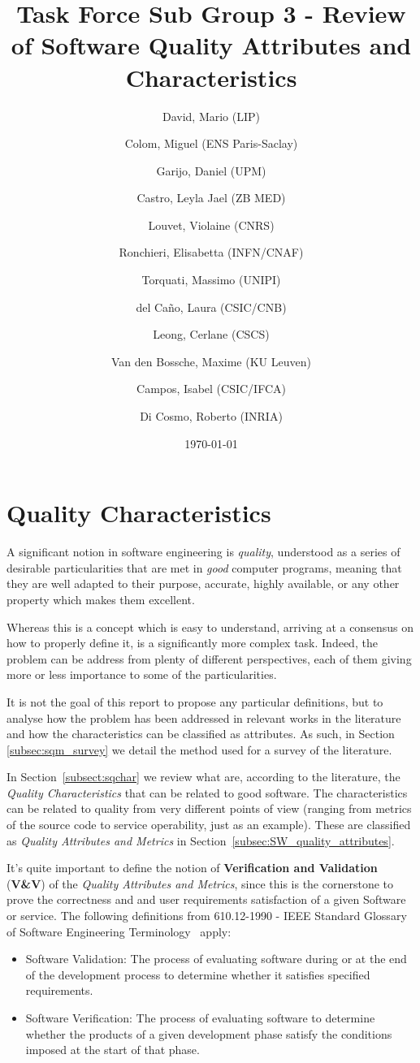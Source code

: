 \documentclass[a4paper]{article}
\title{Task Force Sub Group 3 - Review of Software Quality Attributes and Characteristics}
\author{
    David, Mario (LIP) \orcidlink{0000-0003-1802-5356} \and
    Colom, Miguel (ENS Paris-Saclay) \orcidlink{0000-0003-2636-0656} \and
    Garijo, Daniel (UPM) \orcidlink{0000-0003-0454-7145} \and
    Castro, Leyla Jael (ZB MED) \orcidlink{0000-0003-3986-0510} \and
    Louvet, Violaine (CNRS) \orcidlink{0000-0002-8742-8952} \and
    Ronchieri, Elisabetta (INFN/CNAF) \orcidlink{0000-0002-7341-6491} \and
    Torquati, Massimo (UNIPI) \orcidlink{0000-0001-6323-3459} \and
    del Ca\~{n}o, Laura (CSIC/CNB) \orcidlink{0000-0003-0981-2040} \and
    Leong, Cerlane (CSCS)  \orcidlink{0000-0001-8241-6277} \and
    Van den Bossche, Maxime (KU Leuven) \orcidlink{0000-0002-0938-0156} \and
    Campos, Isabel (CSIC/IFCA) \orcidlink{0000-0002-9350-0383} \and
    Di Cosmo, Roberto (INRIA) \orcidlink{0000-0002-7493-5349}
}
\date{\today}
\begin{document}
\maketitle
\tableofcontents

\newpage
\section{Quality Characteristics}

A significant notion in software engineering is \textit{quality}, understood as a series of desirable particularities that are met in \textit{good} computer programs, meaning that they are well adapted to their purpose, accurate, highly available, or any other property which makes them excellent.

Whereas this is a concept which is easy to understand, arriving at a consensus on how to properly define it, is a significantly more complex task. Indeed, the problem can be address from plenty of different perspectives, each of them giving more or less importance to some of the particularities.

It is not the goal of this report to propose any particular definitions, but to analyse how the problem has been addressed in relevant works in the literature and how the characteristics can be classified as attributes. As such, in Section \ref{subsec:sqm_survey} we detail the method used for a survey of the literature.

In Section~\ref{subsect:sqchar} we review what are, according to the literature, the \textit{Quality Characteristics} that can be related to good software. The characteristics can be related to quality from very different points of view (ranging from metrics of the source code to service operability, just as an example). These are classified as \textit{Quality Attributes and Metrics} in Section~\ref{subsec:SW_quality_attributes}.

It's quite important to define the notion of \textbf{Verification and Validation} (\textbf{V\&V}) of the \textit{Quality Attributes and Metrics}, since this is the cornerstone to prove the correctness and and user requirements satisfaction of a given Software or service. The following definitions from 610.12-1990 - IEEE Standard Glossary of Software Engineering Terminology~\cite{ieee610} apply:

\begin{itemize}
    \item Software Validation: The process of evaluating software during or at the end of the development process to determine whether it satisfies specified requirements.
    \item Software Verification: The process of evaluating software to determine whether the products of a given development phase satisfy the conditions imposed at the start of that phase.
\end{itemize}
\end{document}
